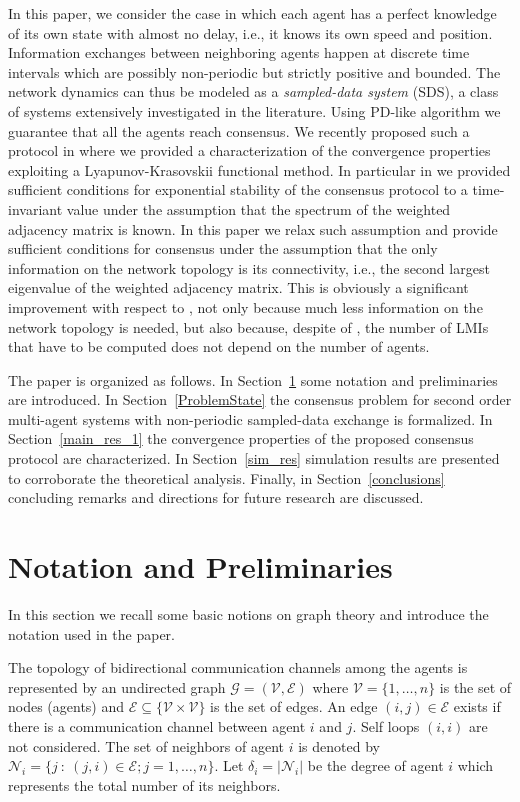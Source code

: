 \documentclass[conference]{IEEEtran}
\begin{document}
In this paper, we consider the case in which each agent has a perfect knowledge of its own state with almost no delay, i.e., it knows its own speed and position. Information exchanges between neighboring agents happen at discrete time intervals which are possibly non-periodic but strictly positive and bounded. The network dynamics can thus be modeled as a \emph{sampled-data system} (SDS), a class of systems extensively investigated in the literature. Using PD-like algorithm we guarantee that all the agents reach consensus. We recently proposed such a protocol in \cite{ETFA2014} where we provided a characterization of the convergence properties exploiting a Lyapunov-Krasovskii functional method. In particular in \cite{ETFA2014} we provided sufficient conditions for exponential stability of the consensus protocol to a time-invariant value under the assumption that the spectrum of the weighted adjacency matrix is known. In this paper we relax such assumption and provide sufficient conditions for consensus under the assumption that the only information on the network topology is its connectivity, i.e., the second largest eigenvalue of the weighted adjacency matrix. This is obviously a significant improvement with respect to \cite{ETFA2014}, not only because much less information on the network topology is needed, but also because, despite of \cite{ETFA2014}, the number of LMIs that have to be computed does not depend on the number of agents.

The paper is organized as follows. In Section~\ref{section:Prob_for} some notation and preliminaries are introduced. In Section~\ref{ProblemState} the consensus problem for second order multi-agent systems with non-periodic sampled-data exchange is formalized. In Section~\ref{main_res_1} the convergence properties of the proposed consensus protocol are characterized. In Section~\ref{sim_res} simulation results are presented to corroborate the theoretical analysis. Finally, in Section~\ref{conclusions} concluding remarks and directions for future research are discussed.


\section{Notation and Preliminaries}\label{section:Prob_for}

In this section we recall some basic notions on graph theory and introduce the notation used in the paper.

The topology of bidirectional communication channels
among the agents is represented by an undirected graph $\mathcal{G}=(\mathcal{V}, \mathcal{E})$ where $\mathcal{V}=\{1,\ldots,n\}$ is the set of nodes (agents) and $\mathcal{E}\subseteq\{\mathcal{V}\times \mathcal{V}\}$ is the set of edges. An edge $(i, j) \in  \mathcal{E}$ exists if there is a
communication channel between agent $i$ and $j$. Self loops
$(i, i)$ are not considered. The set of neighbors of agent $i$
is denoted by $\mathcal{N}_i  = \{j \ : \ (j, i) \in  \mathcal{E}; j = 1, \ldots, n\}$. Let
$\delta_i = |\mathcal{N}_i|$ be the degree of agent $i$ which represents the total
number of its neighbors.
\end{document}
